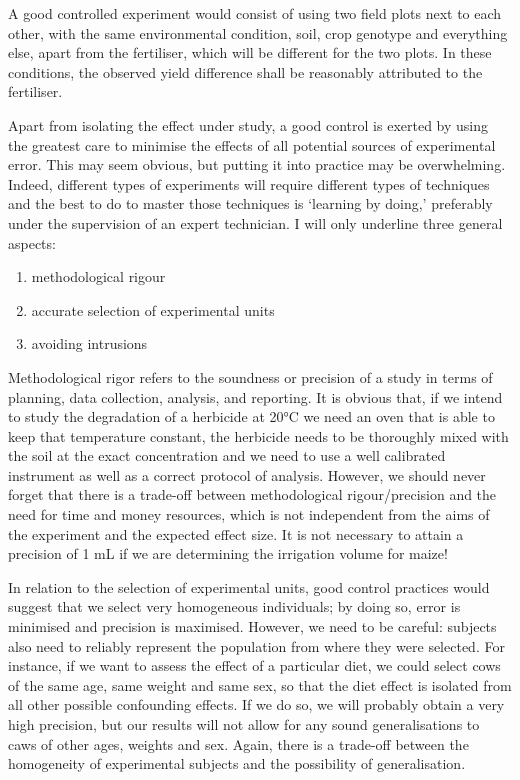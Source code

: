 \documentclass[a4paper,12pt,oneside]{book}
\providecommand{\tightlist}{%
  \setlength{\itemsep}{0pt}\setlength{\parskip}{0pt}}
\begin{document}
A good controlled experiment would consist of using two field plots next to each other, with the same environmental condition, soil, crop genotype and everything else, apart from the fertiliser, which will be different for the two plots. In these conditions, the observed yield difference shall be reasonably attributed to the fertiliser.

Apart from isolating the effect under study, a good control is exerted by using the greatest care to minimise the effects of all potential sources of experimental error. This may seem obvious, but putting it into practice may be overwhelming. Indeed, different types of experiments will require different types of techniques and the best to do to master those techniques is `learning by doing,' preferably under the supervision of an expert technician. I will only underline three general aspects:

\begin{enumerate}
\def\labelenumi{\arabic{enumi}.}
\tightlist
\item
  methodological rigour
\item
  accurate selection of experimental units
\item
  avoiding intrusions
\end{enumerate}

Methodological rigor refers to the soundness or precision of a study in terms of planning, data collection, analysis, and reporting. It is obvious that, if we intend to study the degradation of a herbicide at 20°C we need an oven that is able to keep that temperature constant, the herbicide needs to be thoroughly mixed with the soil at the exact concentration and we need to use a well calibrated instrument as well as a correct protocol of analysis. However, we should never forget that there is a trade-off between methodological rigour/precision and the need for time and money resources, which is not independent from the aims of the experiment and the expected effect size. It is not necessary to attain a precision of 1 mL if we are determining the irrigation volume for maize!

In relation to the selection of experimental units, good control practices would suggest that we select very homogeneous individuals; by doing so, error is minimised and precision is maximised. However, we need to be careful: subjects also need to reliably represent the population from where they were selected. For instance, if we want to assess the effect of a particular diet, we could select cows of the same age, same weight and same sex, so that the diet effect is isolated from all other possible confounding effects. If we do so, we will probably obtain a very high precision, but our results will not allow for any sound generalisations to caws of other ages, weights and sex. Again, there is a trade-off between the homogeneity of experimental subjects and the possibility of generalisation.
\end{document}
